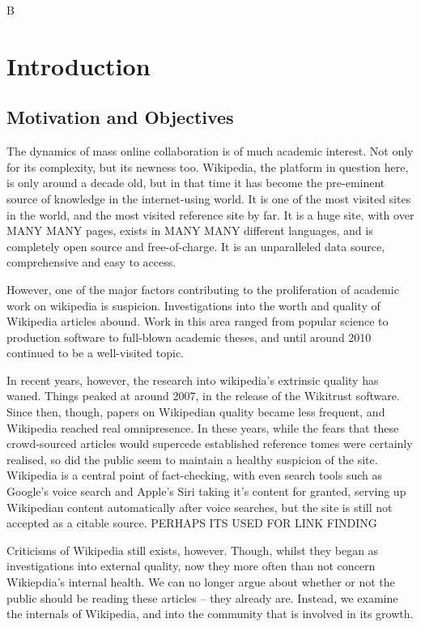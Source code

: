 B\chapter{Introduction}

\section{Motivation and Objectives}

The dynamics of mass online collaboration is of much academic
interest. Not only for its complexity, but its newness too. Wikipedia,
the platform in question here, is only around a decade old, but in
that time it has become the pre-eminent source of knowledge in the
internet-using world. It is one of the most visited sites in the
world, and the most visited reference site by far. It is a huge site,
with over MANY MANY pages, exists in MANY MANY different languages,
and is completely open source and free-of-charge. It is an
unparalleled data source, comprehensive and easy to access.

However, one of the major factors contributing to the proliferation of
academic work on wikipedia is suspicion. Investigations into the worth
and quality of Wikipedia articles abound. Work in this area ranged
from popular science to production software to full-blown academic
theses, and until around 2010 continued to be a well-visited topic.

In recent years, however, the research into wikipedia's extrinsic
quality has waned. Things peaked at around 2007, in the release of
the Wikitrust software. Since then, though, papers on Wikipedian
quality became less frequent, and Wikipedia reached real omnipresence.
In these years, while the fears that these crowd-sourced articles
would supercede established reference tomes were certainly realised,
so did the public seem to maintain a healthy suspicion of the
site. Wikipedia is a central point of fact-checking, with even search
tools such as Google's voice search and Apple's Siri taking it's
content for granted, serving up Wikipedian content automatically after
voice searches, but the site is still not accepted as a citable
source. PERHAPS ITS USED FOR LINK FINDING

Criticisms of Wikipedia still exists, however. Though, whilst they
began as investigations into external quality, now they more often
than not concern Wikiepdia's internal health. We can no longer argue
about whether or not the public should be reading these articles --
they already are. Instead, we examine the internals of Wikipedia, and
into the community that is involved in its growth. 

